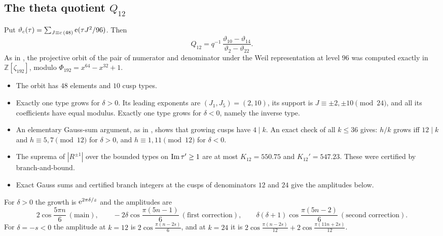 \documentclass[11pt]{amsart}
\theoremstyle{remark}
\newcommand{\Z}{\mathbb Z}\newcommand{\Q}{\mathbb Q}\newcommand{\C}{\mathbb C}
\begin{document}
\subsection{The theta quotient $Q_{12}$}
Put $\vartheta_c(\tau)=\sum_{J\equiv c\,(48)}\mathrm e(\tau J^2/96)$. Then
\[
Q_{12}=q^{-1}\,\frac{\vartheta_{10}-\vartheta_{14}}{\vartheta_2-\vartheta_{22}}.
\]
As in \cite{P1}, the projective orbit of the pair of numerator and denominator under the Weil representation at level $96$ was computed exactly in $\Z[\zeta_{192}]$, modulo $\Phi_{192}=x^{64}-x^{32}+1$.
\begin{itemize}[leftmargin=2em]
\item The orbit has $48$ elements and $10$ cusp types.
\item Exactly one type grows for $\delta>0$. Its leading exponents are $(J_1,J_5)=(2,10)$, its support is $J\equiv\pm2,\pm10\pmod{24}$, and all its coefficients have equal modulus. Exactly one type grows for $\delta<0$, namely the inverse type.
\item An elementary Gauss-sum argument, as in \cite[Lemma 3.5]{P1}, shows that growing cusps have $4\mid k$. An exact check of all $k\le36$ gives: $h/k$ grows iff $12\mid k$ and $h\equiv5,7\pmod{12}$ for $\delta>0$, and $h\equiv1,11\pmod{12}$ for $\delta<0$.
\item The suprema of $|R^{\pm1}|$ over the bounded types on $\operatorname{Im}\tau'\ge1$ are at most $K_{12}=550.75$ and $K_{12}'=547.23$. These were certified by branch-and-bound.
\item Exact Gauss sums and certified branch integers at the cusps of denominators $12$ and $24$ give the amplitudes below.
\end{itemize}
For $\delta>0$ the growth is $\mathrm e^{2\pi\delta/z}$ and the amplitudes are
\[
2\cos\frac{5\pi n}6\ (\text{main}),\qquad -2\delta\cos\frac{\pi(5n-1)}6\ (\text{first correction}),\qquad \delta(\delta+1)\cos\frac{\pi(5n-2)}6\ (\text{second correction}).
\]
For $\delta=-s<0$ the amplitude at $k=12$ is $2\cos\frac{\pi(n-2s)}6$, and at $k=24$ it is $2\cos\frac{\pi(n-2s)}{12}+2\cos\frac{\pi(11n+2s)}{12}$.
\end{document}

